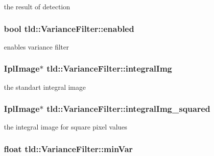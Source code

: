 the result of detection 

\hypertarget{classtld_1_1VarianceFilter_a07f3cd680554508eb6effc4c4b92c322}{
\subsubsection[{enabled}]{\setlength{\rightskip}{0pt plus 5cm}bool tld\-::\-Variance\-Filter\-::enabled}}\label{classtld_1_1VarianceFilter_a07f3cd680554508eb6effc4c4b92c322}


enables variance filter 

\hypertarget{classtld_1_1VarianceFilter_acec215a321ba79cb9489f49e9e358d9a}{
\subsubsection[{integral\-Img}]{\setlength{\rightskip}{0pt plus 5cm}Ipl\-Image$\ast$ tld\-::\-Variance\-Filter\-::integral\-Img\hspace{0.3cm}{\ttfamily [private]}}}\label{classtld_1_1VarianceFilter_acec215a321ba79cb9489f49e9e358d9a}


the standart integral image 

\hypertarget{classtld_1_1VarianceFilter_af03a14687ee0595c0d145f1856e302ef}{
\subsubsection[{integral\-Img\-\_\-squared}]{\setlength{\rightskip}{0pt plus 5cm}Ipl\-Image$\ast$ tld\-::\-Variance\-Filter\-::integral\-Img\-\_\-squared\hspace{0.3cm}{\ttfamily [private]}}}\label{classtld_1_1VarianceFilter_af03a14687ee0595c0d145f1856e302ef}


the integral image for square pixel values 

\hypertarget{classtld_1_1VarianceFilter_ad5fd1b805c1cb461a31f61dd6fdb8f07}{
\subsubsection[{min\-Var}]{\setlength{\rightskip}{0pt plus 5cm}float tld\-::\-Variance\-Filter\-::min\-Var}}\label{classtld_1_1VarianceFilter_ad5fd1b805c1cb461a31f61dd6fdb8f07}


